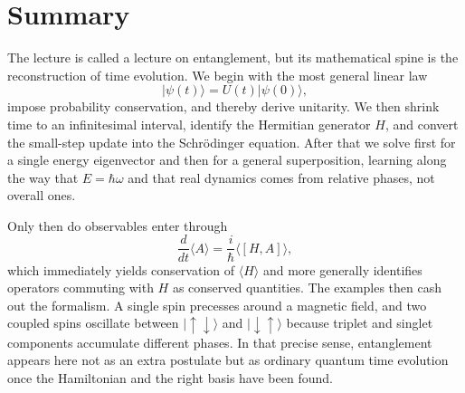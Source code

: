 \section{Summary}

The lecture is called a lecture on entanglement, but its mathematical spine is the reconstruction of time evolution. We begin with the most general linear law
\begin{equation}
|\psi(t)\rangle = U(t)|\psi(0)\rangle,
\end{equation}
impose probability conservation, and thereby derive unitarity. We then shrink time to an infinitesimal interval, identify the Hermitian generator \(H\), and convert the small-step update into the Schrödinger equation. After that we solve first for a single energy eigenvector and then for a general superposition, learning along the way that \(E=\hbar\omega\) and that real dynamics comes from relative phases, not overall ones.

Only then do observables enter through
\begin{equation}
\frac{d}{dt}\langle A\rangle=\frac{i}{\hbar}\langle[H,A]\rangle,
\end{equation}
which immediately yields conservation of \(\langle H\rangle\) and more generally identifies operators commuting with \(H\) as conserved quantities. The examples then cash out the formalism. A single spin precesses around a magnetic field, and two coupled spins oscillate between \(|\uparrow\downarrow\rangle\) and \(|\downarrow\uparrow\rangle\) because triplet and singlet components accumulate different phases. In that precise sense, entanglement appears here not as an extra postulate but as ordinary quantum time evolution once the Hamiltonian and the right basis have been found.